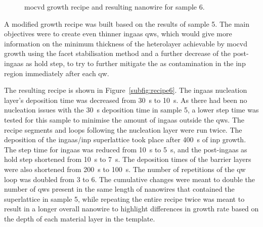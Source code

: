 \begin{figure}
{
    }
    \caption{\acs{mocvd} growth recipe  and resulting nanowire  for sample 6.}
    \label{fig:s6_recipe+OV}
\end{figure}

A modified growth recipe was built based on the results of sample 5. The main objectives were to create even thinner \acs{ingaas} \acl{qw}s, which would give more information on the minimum thickness of the heterolayer achievable by \acs{mocvd} growth using the facet stabilisation method and a further decrease of the post-\acs{ingaas} \acl{as} hold step, to try to further mitigate the \acl{as} contamination in the \acs{inp} region immediately after each \acl{qw}.

The resulting recipe is shown in Figure~\ref{subfig:recipe6}. The \acs{ingaas} nucleation layer's deposition time was decreased from \qty{30}{\second} to \qty{10}{\second}. As there had been no nucleation issues with the \qty{30}{\second} deposition time in sample 5, a lower step time was tested for this sample to minimise the amount of \acs{ingaas} outside the \acl{qw}s. The recipe segments and loops following the nucleation layer were run twice. The deposition of the \acs{ingaas}/\acs{inp} superlattice took place after \qty{400}{\second} of \acs{inp} growth. The step time for \acs{ingaas} was reduced from \qty{10}{\second} to \qty{5}{\second}, and the post-\acs{ingaas} \acl{as} hold step shortened from \qty{10}{\second} to \qty{7}{\second}. The deposition times of the barrier layers were also shortened from \qty{200}{\second} to \qty{100}{\second}. The number of repetitions of the \acl{qw} loop was doubled from \num{3} to \num{6}. The cumulative changes were meant to double the number of \acl{qw}s present in the same length of nanowires that contained the superlattice in sample 5, while repeating the entire recipe twice was meant to result in a longer overall nanowire to highlight differences in growth rate based on the depth of each material layer in the template.

